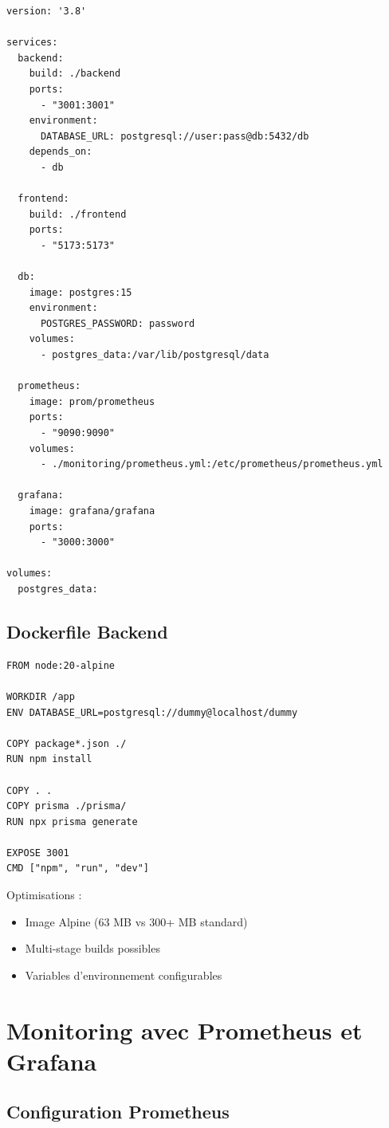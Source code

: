 \documentclass[12pt,a4paper]{report}
\begin{document}
\begin{verbatim}
version: '3.8'

services:
  backend:
    build: ./backend
    ports:
      - "3001:3001"
    environment:
      DATABASE_URL: postgresql://user:pass@db:5432/db
    depends_on:
      - db
      
  frontend:
    build: ./frontend
    ports:
      - "5173:5173"
    
  db:
    image: postgres:15
    environment:
      POSTGRES_PASSWORD: password
    volumes:
      - postgres_data:/var/lib/postgresql/data
      
  prometheus:
    image: prom/prometheus
    ports:
      - "9090:9090"
    volumes:
      - ./monitoring/prometheus.yml:/etc/prometheus/prometheus.yml
      
  grafana:
    image: grafana/grafana
    ports:
      - "3000:3000"

volumes:
  postgres_data:
\end{verbatim}

\subsection{Dockerfile Backend}

\begin{verbatim}
FROM node:20-alpine

WORKDIR /app
ENV DATABASE_URL=postgresql://dummy@localhost/dummy

COPY package*.json ./
RUN npm install

COPY . .
COPY prisma ./prisma/
RUN npx prisma generate

EXPOSE 3001
CMD ["npm", "run", "dev"]
\end{verbatim}

Optimisations :
\begin{itemize}
    \item Image Alpine (63 MB vs 300+ MB standard)
    \item Multi-stage builds possibles
    \item Variables d'environnement configurables
\end{itemize}

\section{Monitoring avec Prometheus et Grafana}

\subsection{Configuration Prometheus}
\end{document}
